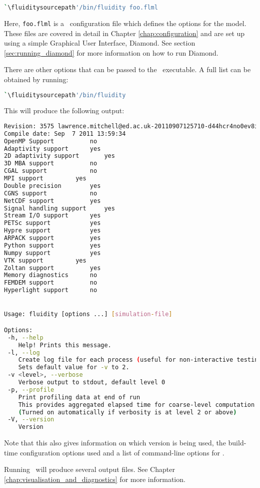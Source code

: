 \begin{lstlisting}[language=bash]
`\fluiditysourcepath'/bin/fluidity foo.flml
\end{lstlisting}

Here, \lstinline[language=Bash]+foo.flml+ is a \fluidity\ configuration file
which defines the options for the model. These files are covered in detail in 
Chapter \ref{chap:configuration} and are set up using a simple Graphical User
Interface, Diamond. See section \ref{sec:running_diamond} for more information 
on how to run Diamond.

There are other options that can be passed to the \fluidity\ executable. A full
list can be obtained by running:

\begin{lstlisting}[language=bash]
`\fluiditysourcepath'/bin/fluidity
\end{lstlisting}

This will produce the following output:

\begin{lstlisting}[language=Bash]
Revision: 3575 lawrence.mitchell@ed.ac.uk-20110907125710-d44hcr4no0ev8icc
Compile date: Sep  7 2011 13:59:34
OpenMP Support			no
Adaptivity support		yes
2D adaptivity support		yes
3D MBA support			no
CGAL support			no
MPI support			yes
Double precision		yes
CGNS support			no
NetCDF support			yes
Signal handling support		yes
Stream I/O support		yes
PETSc support			yes
Hypre support			yes
ARPACK support			yes
Python support			yes
Numpy support			yes
VTK support			yes
Zoltan support			yes
Memory diagnostics		no
FEMDEM support			no
Hyperlight support		no


Usage: fluidity [options ...] [simulation-file]

Options:
 -h, --help
    Help! Prints this message.
 -l, --log
    Create log file for each process (useful for non-interactive testing).
    Sets default value for -v to 2.
 -v <level>, --verbose
    Verbose output to stdout, default level 0
 -p, --profile
    Print profiling data at end of run
    This provides aggregated elapsed time for coarse-level computation
    (Turned on automatically if verbosity is at level 2 or above)
 -V, --version
    Version
\end{lstlisting}

Note that this also gives information on which version is being used, the
build-time configuration options used and a list of command-line options for
\fluidity. 

Running \fluidity\ will produce several output files. See Chapter \ref{chap:visualisation_and_diagnostics}
for more information.

